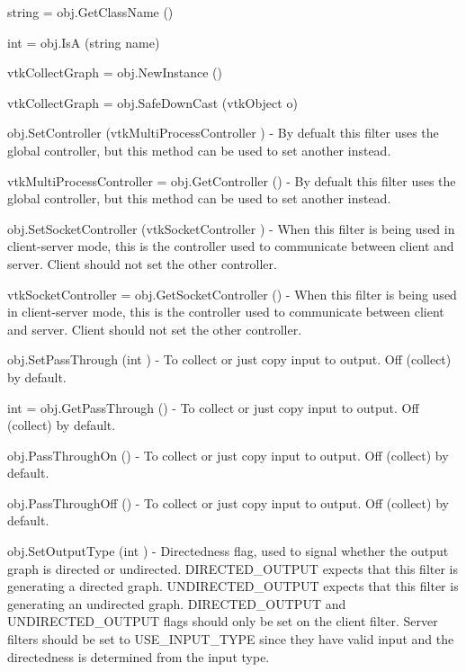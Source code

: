 \begin{DoxyItemize}
\item {\ttfamily string = obj.\-Get\-Class\-Name ()}  
\item {\ttfamily int = obj.\-Is\-A (string name)}  
\item {\ttfamily vtk\-Collect\-Graph = obj.\-New\-Instance ()}  
\item {\ttfamily vtk\-Collect\-Graph = obj.\-Safe\-Down\-Cast (vtk\-Object o)}  
\item {\ttfamily obj.\-Set\-Controller (vtk\-Multi\-Process\-Controller )} -\/ By defualt this filter uses the global controller, but this method can be used to set another instead.  
\item {\ttfamily vtk\-Multi\-Process\-Controller = obj.\-Get\-Controller ()} -\/ By defualt this filter uses the global controller, but this method can be used to set another instead.  
\item {\ttfamily obj.\-Set\-Socket\-Controller (vtk\-Socket\-Controller )} -\/ When this filter is being used in client-\/server mode, this is the controller used to communicate between client and server. Client should not set the other controller.  
\item {\ttfamily vtk\-Socket\-Controller = obj.\-Get\-Socket\-Controller ()} -\/ When this filter is being used in client-\/server mode, this is the controller used to communicate between client and server. Client should not set the other controller.  
\item {\ttfamily obj.\-Set\-Pass\-Through (int )} -\/ To collect or just copy input to output. Off (collect) by default.  
\item {\ttfamily int = obj.\-Get\-Pass\-Through ()} -\/ To collect or just copy input to output. Off (collect) by default.  
\item {\ttfamily obj.\-Pass\-Through\-On ()} -\/ To collect or just copy input to output. Off (collect) by default.  
\item {\ttfamily obj.\-Pass\-Through\-Off ()} -\/ To collect or just copy input to output. Off (collect) by default.  
\item {\ttfamily obj.\-Set\-Output\-Type (int )} -\/ Directedness flag, used to signal whether the output graph is directed or undirected. D\-I\-R\-E\-C\-T\-E\-D\-\_\-\-O\-U\-T\-P\-U\-T expects that this filter is generating a directed graph. U\-N\-D\-I\-R\-E\-C\-T\-E\-D\-\_\-\-O\-U\-T\-P\-U\-T expects that this filter is generating an undirected graph. D\-I\-R\-E\-C\-T\-E\-D\-\_\-\-O\-U\-T\-P\-U\-T and U\-N\-D\-I\-R\-E\-C\-T\-E\-D\-\_\-\-O\-U\-T\-P\-U\-T flags should only be set on the client filter. Server filters should be set to U\-S\-E\-\_\-\-I\-N\-P\-U\-T\-\_\-\-T\-Y\-P\-E since they have valid input and the directedness is determined from the input type.  

\end{DoxyItemize}
